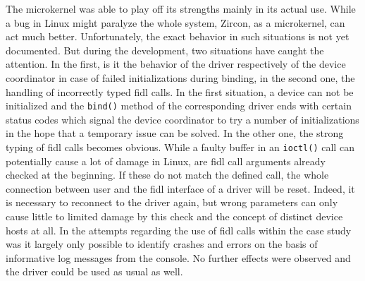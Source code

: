 The microkernel was able to play off its strengths mainly in its actual use.
While a bug in Linux might paralyze the whole system, Zircon, as a microkernel, can act much better.
Unfortunately, the exact behavior in such situations is not yet documented.
But during the development, two situations have caught the attention.
In the first, is it the behavior of the driver respectively of the device coordinator in case of failed initializations during binding, in the second one, the handling of incorrectly typed \ac{fidl} calls.
In the first situation, a device can not be initialized and the \texttt{bind()} method of the corresponding driver ends with certain status codes which signal the device coordinator to try a number of initializations in the hope that a temporary issue can be solved.
In the other one, the strong typing of \ac{fidl} calls becomes obvious.
While a faulty buffer in an \texttt{ioctl()} call can potentially cause a lot of damage in Linux, are \ac{fidl} call arguments already checked at the beginning.
If these do not match the defined call, the whole connection between user and the \ac{fidl} interface of a driver will be reset.
Indeed, it is necessary to reconnect to the driver again, but wrong parameters can only cause little to limited damage by this check and the concept of distinct device hosts at all.
In the attempts regarding the use of \ac{fidl} calls within the case study was it largely only possible to identify crashes and errors on the basis of informative log messages from the console.
No further effects were observed and the driver could be used as usual as well.

